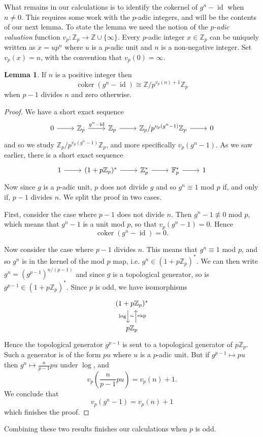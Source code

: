\documentclass[a4paper]{article} %
\theoremstyle{definition}
\newtheorem{lemma}[theorem]{Lemma}
\newcommand{\Z}{\mathbb{Z}}
\newcommand{\F}{\mathbb{F}}
\DeclareMathOperator{\id}{id}           %
\DeclareMathOperator{\coker}{coker}     %
\begin{document}
What remains in our calculations is to identify the cokernel of $g^n-\id$ when $n \neq 0$. This requires some work with the $p$-adic integers, and will be the contents of our next lemma. To state the lemma we need the notion of the \textit{$p$-adic valuation} function $v_p \colon \Z_p \to \Z \cup \{\infty\}$. Every $p$-adic integer $x \in \Z_p$ can be uniquely written as $x = up^n$ where $u$ is a $p$-adic unit and $n$ is a non-negative integer. Set $v_p(x) = n$, with the convention that $v_p(0) = \infty$.
\begin{lemma}
  If $n$ is a positive integer then
  \[
    \coker(g^n - \id) \cong \Z/p^{v_p(n)+1}\Z_p
  \]
  when $p-1$ divides $n$ and zero otherwise.
\end{lemma}
\begin{proof}
We have a short exact sequence 
\[
\begin{tikzcd}
0 \rar & \Z_p \rar{g^n - \operatorname{id}} & \Z_p \rar{} & \Z_p/{p^{v_p(g^n-1)}\Z_p} \rar & 0
\end{tikzcd}
\]
and so we study $\Z_p/{p^{v_p(g^n-1)}\Z_p}$, and more specifically $v_p(g^n-1)$. As we saw earlier, there is a short exact sequence
\[
\begin{tikzcd}
1 \rar & (1+p\Z_p)^* \rar{} & \Z_p^* \rar{} & \F_p^* \rar & 1
\end{tikzcd}
\]
Now since $g$ is a $p$-adic unit, $p$ does not divide $g$ and so $g^n \equiv 1$ mod $p$ if, and only if, $p-1$ divides $n$. We split the proof in two cases.

First, consider the case where $p-1$ does not divide $n$. Then $g^n -1 \not\equiv 0$ mod $p$, which means that $g^n -1$ is a unit mod $p$, so that $v_p(g^n - 1) = 0$. Hence
\[
\coker ( g^n - \id ) = 0.
\]

Now consider the case where $p-1$ divides $n$. This means that $g^n \equiv 1$ mod $p$, and so $g^n$ is in the kernel of the mod $p$ map, i.e. $g^n \in (1 + p\Z_p)^*$. We can then write $g^n = (g^{p-1})^{n/(p-1)}$ and since $g$ is a topological generator, so is $g^{p-1} \in (1 + p\Z_p)^*$. Since $p$ is odd, we have isomorphisms
\[
\begin{tikzcd}
  (1+ p\Z_p)^* \arrow[d, "\log"', "\sim", shift right=1.3ex] \\
  p\Z_p \arrow[u, "\exp"', shift right = 1.3ex]{exp}
\end{tikzcd}
\]
Hence the topological generator $g^{p-1}$ is sent to a topological generator of $p\Z_p$. Such a generator is of the form $pu$ where $u$ is a $p$-adic unit. But if $g^{p-1} \mapsto pu$ then $g^n \mapsto \frac{n}{p-1}pu$ under $\log$, and $$v_p\left(\frac{n}{p-1}pu\right) = v_p(n)+1.$$ We conclude that
\[
v_p(g^n - 1 ) = v_p(n) + 1
\]
which finishes the proof.
\end{proof}
Combining these two results finishes our calculations when $p$ is odd.
\end{document}

